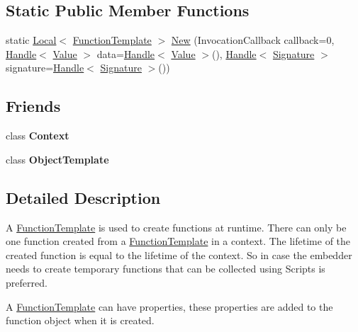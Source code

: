 \subsection*{Static Public Member Functions}
\begin{DoxyCompactItemize}
\item 
static \hyperlink{classv8_1_1_local}{Local}$<$ \hyperlink{classv8_1_1_function_template}{Function\+Template} $>$ \hyperlink{classv8_1_1_function_template_af9012aee4a102c4018fec8e9532cb996}{New} (Invocation\+Callback callback=0, \hyperlink{classv8_1_1_handle}{Handle}$<$ \hyperlink{classv8_1_1_value}{Value} $>$ data=\hyperlink{classv8_1_1_handle}{Handle}$<$ \hyperlink{classv8_1_1_value}{Value} $>$(), \hyperlink{classv8_1_1_handle}{Handle}$<$ \hyperlink{classv8_1_1_signature}{Signature} $>$ signature=\hyperlink{classv8_1_1_handle}{Handle}$<$ \hyperlink{classv8_1_1_signature}{Signature} $>$())
\end{DoxyCompactItemize}
\subsection*{Friends}
\begin{DoxyCompactItemize}
\item 
\hypertarget{classv8_1_1_function_template_ac26c806e60ca4a0547680edb68f6e39b}{}class {\bfseries Context}\label{classv8_1_1_function_template_ac26c806e60ca4a0547680edb68f6e39b}

\item 
\hypertarget{classv8_1_1_function_template_a4d28646409234f556983be8a96c06424}{}class {\bfseries Object\+Template}\label{classv8_1_1_function_template_a4d28646409234f556983be8a96c06424}

\end{DoxyCompactItemize}


\subsection{Detailed Description}
A \hyperlink{classv8_1_1_function_template}{Function\+Template} is used to create functions at runtime. There can only be one function created from a \hyperlink{classv8_1_1_function_template}{Function\+Template} in a context. The lifetime of the created function is equal to the lifetime of the context. So in case the embedder needs to create temporary functions that can be collected using Scripts is preferred.

A \hyperlink{classv8_1_1_function_template}{Function\+Template} can have properties, these properties are added to the function object when it is created.

